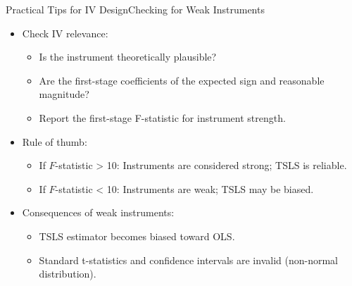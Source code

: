 \documentclass[dvipsnames,hyperref={pdfpagelabels=false}]{beamer}
\begin{document}
\begin{frame}{Practical Tips for IV Design}{Checking for Weak Instruments}
	\begin{itemize}
		\item[1.] Check IV relevance:
		\begin{itemize}
			\vspace{0.2cm}
			\item Is the instrument theoretically plausible?
			\vspace{0.2cm}
			\item Are the first-stage coefficients of the expected sign and reasonable magnitude?
			\vspace{0.2cm}
			\item Report the first-stage F-statistic for instrument strength.
		\end{itemize}
		\vspace{0.3cm}
		\item Rule of thumb:
		\begin{itemize}
			\vspace{0.2cm}
			\item If $F$-statistic > 10: Instruments are considered strong; TSLS is reliable.
			\vspace{0.2cm}
			\item If $F$-statistic < 10: Instruments are weak; TSLS may be biased.
		\end{itemize}
		\vspace{0.3cm}
		\item Consequences of weak instruments:
		\begin{itemize}
			\vspace{0.2cm}
			\item TSLS estimator becomes biased toward OLS.
			\vspace{0.2cm}
			\item Standard t-statistics and confidence intervals are invalid (non-normal distribution).
		\end{itemize}
	\end{itemize}
\end{frame}
\end{document}
